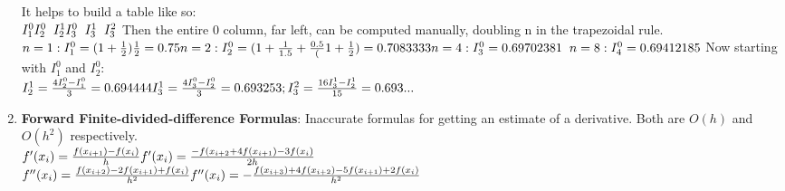 \documentclass[fontsize=5pt]{scrartcl}
\begin{document}
\begin{multicols}{3}
\begin{enumerate}
         It helps to build a table like so: \\
         \begin{math}
           I^0_1 \\
           I^0_2\hspace{2mm}I^1_2 \\
           I^0_3\hspace{2mm}I^1_3\hspace{2mm}I^2_3 \\
         \end{math}
         Then the entire 0 column, far left, can be computed manually, doubling n in the trapezoidal rule. \\
         \begin{math}
           n=1: I^0_1 = (1+\frac{1}{2})\frac{1}{2} = 0.75 \\
           n=2: I^0_2 = (1+\frac{1}{1.5}+\frac{0.5}(1+\frac{1}{2})=0.7083333\\
           n=4: I^0_3 = 0.69702381 \hspace{2mm}%
           n=8: I^0_4 = 0.69412185 \\
         \end{math}
         Now starting with $I^0_1$ and $I^0_2$: \\
         \begin{math}
           I^1_2=\frac{4I^0_2-I^0_1}{3} = 0.694444 \\
           I^1_3=\frac{4I^0_3-I^0_2}{3}=0.693253;\vspace{2mm} I^2_3=\frac{16I^1_3-I^1_2}{15}=0.693... \\
         \end{math}

        \item \textbf{Forward Finite-divided-difference Formulas}: Inaccurate formulas for getting an estimate
          of a derivative. Both are $O(h)$ and $O(h^2)$ respectively.\\
        \begin{math}
          f'(x_i)=\frac{f(x_{i+1})-f(x_i)}{h}\\
          f'(x_i)=\frac{-f(x_{i+2}+4f(x_{i+1})-3f(x_i)}{2h}\\
        \end{math} \\
        \begin{math}
          f''(x_i)=\frac{f(x_{i+2})-2f(x_{i+1})+f(x_i)}{h^2} \\
          f''(x_i)=-\frac{f(x_{i+3})+4f(x_{i+2})-5f(x_{i+1})+2f(x_i)}{h^2} \\
        \end{math} \\
        

\end{enumerate}
\end{multicols}
\end{document}
